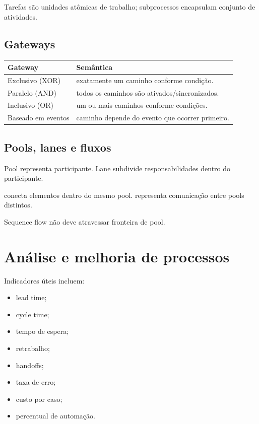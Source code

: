 Tarefas são unidades atômicas de trabalho; subprocessos encapsulam conjunto de atividades.

\subsection{Gateways}

\begin{table}[ht]
\centering
\small
\begin{tabularx}{\textwidth}{l X}
\toprule
Gateway & Semântica \\
\midrule
Exclusivo (XOR) & exatamente um caminho conforme condição. \\
Paralelo (AND) & todos os caminhos são ativados/sincronizados. \\
Inclusivo (OR) & um ou mais caminhos conforme condições. \\
Baseado em eventos & caminho depende do evento que ocorrer primeiro. \\
\bottomrule
\end{tabularx}
\end{table}

\subsection{Pools, lanes e fluxos}

Pool representa participante. Lane subdivide responsabilidades dentro do participante.

 conecta elementos dentro do mesmo pool.  representa comunicação entre pools distintos.

Sequence flow não deve atravessar fronteira de pool.

\section{Análise e melhoria de processos}

Indicadores úteis incluem:
\begin{itemize}
\item lead time;
\item cycle time;
\item tempo de espera;
\item retrabalho;
\item handoffs;
\item taxa de erro;
\item custo por caso;
\item percentual de automação.
\end{itemize}

